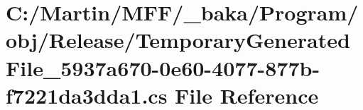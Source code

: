 \hypertarget{_program_2obj_2_release_2_temporary_generated_file__5937a670-0e60-4077-877b-f7221da3dda1_8cs}{}\section{C\+:/\+Martin/\+M\+F\+F/\+\_\+baka/\+Program/obj/\+Release/\+Temporary\+Generated\+File\+\_\+5937a670-\/0e60-\/4077-\/877b-\/f7221da3dda1.cs File Reference}
\label{_program_2obj_2_release_2_temporary_generated_file__5937a670-0e60-4077-877b-f7221da3dda1_8cs}
